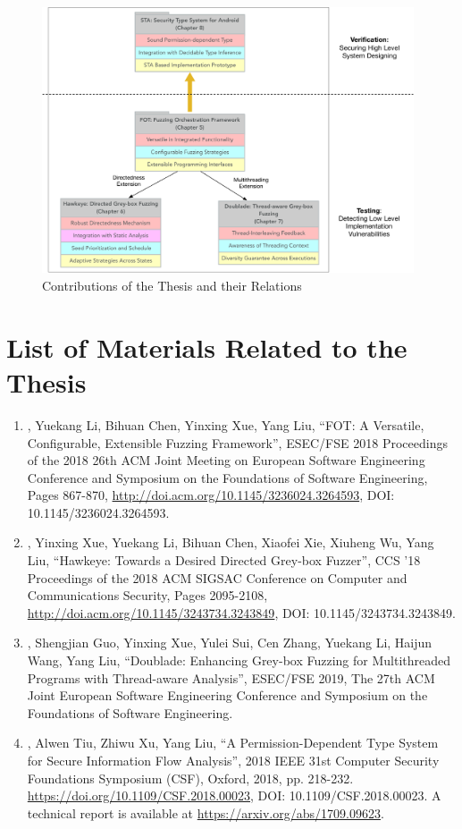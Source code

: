 \begin{figure}[ht]
	\begin{center}
		\includegraphics[width=0.98\textwidth]{res/contributions}
		\caption{Contributions of the Thesis and their Relations}
		\label{fig:works}
	\end{center}
\end{figure}


\section{List of Materials Related to the Thesis}
\begin{enumerate}
	\item \myname, Yuekang Li, Bihuan Chen, Yinxing Xue, Yang Liu, ``FOT: A Versatile, Configurable, Extensible Fuzzing Framework'', ESEC/FSE 2018 Proceedings of the 2018 26th ACM Joint Meeting on European Software Engineering Conference and Symposium on the Foundations of Software Engineering, Pages 867-870, \url{http://doi.acm.org/10.1145/3236024.3264593}, DOI: 10.1145/3236024.3264593.
	\item \myname, Yinxing Xue, Yuekang Li, Bihuan Chen, Xiaofei Xie, Xiuheng Wu, Yang Liu, ``Hawkeye: Towards a Desired Directed Grey-box Fuzzer'', CCS '18 Proceedings of the 2018 ACM SIGSAC Conference on Computer and Communications Security, Pages 2095-2108, \url{http://doi.acm.org/10.1145/3243734.3243849}, DOI: 10.1145/3243734.3243849.
	\item \myname, Shengjian Guo, Yinxing Xue, Yulei Sui, Cen Zhang, Yuekang Li, Haijun Wang, Yang Liu, ``Doublade: Enhancing Grey-box Fuzzing for Multithreaded Programs with Thread-aware Analysis'', ESEC/FSE 2019, The 27th ACM Joint European Software Engineering Conference and Symposium on the Foundations of Software Engineering.
	\item \myname, Alwen Tiu, Zhiwu Xu, Yang Liu, ``A Permission-Dependent Type System for Secure Information Flow Analysis'', 2018 IEEE 31st Computer Security Foundations Symposium (CSF), Oxford, 2018, pp. 218-232. \url{https://doi.org/10.1109/CSF.2018.00023}, DOI: 10.1109/CSF.2018.00023. A technical report is available at \url{https://arxiv.org/abs/1709.09623}.
\end{enumerate}

